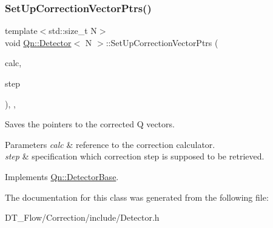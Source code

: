 \subsubsection{\texorpdfstring{Set\+Up\+Correction\+Vector\+Ptrs()}{SetUpCorrectionVectorPtrs()}}
{\footnotesize\ttfamily template$<$std\+::size\+\_\+t N$>$ \\
void \mbox{\hyperlink{classQn_1_1Detector}{Qn\+::\+Detector}}$<$ N $>$\+::Set\+Up\+Correction\+Vector\+Ptrs (\begin{DoxyParamCaption}\item[{const \mbox{\hyperlink{classQn_1_1CorrectionCalculator}{Qn\+::\+Correction\+Calculator}} \&}]{calc,  }\item[{std\+::string}]{step }\end{DoxyParamCaption})\hspace{0.3cm}{\ttfamily [inline]}, {\ttfamily [override]}, {\ttfamily [virtual]}}



Saves the pointers to the corrected Q vectors. 


\begin{DoxyParams}{Parameters}
{\em calc} & reference to the correction calculator. \\
\hline
{\em step} & specification which correction step is supposed to be retrieved. \\
\hline
\end{DoxyParams}


Implements \mbox{\hyperlink{classQn_1_1DetectorBase}{Qn\+::\+Detector\+Base}}.



The documentation for this class was generated from the following file\+:\begin{DoxyCompactItemize}
\item 
D\+T\+\_\+\+Flow/\+Correction/include/Detector.\+h\end{DoxyCompactItemize}
